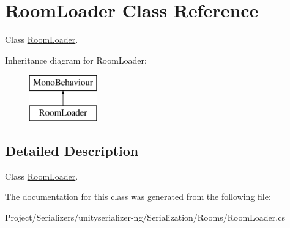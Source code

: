 \hypertarget{class_room_loader}{}\section{Room\+Loader Class Reference}
\label{class_room_loader}


Class \hyperlink{class_room_loader}{Room\+Loader}.  


Inheritance diagram for Room\+Loader\+:\begin{figure}[H]
\begin{center}
\leavevmode
\includegraphics[height=2.000000cm]{class_room_loader}
\end{center}
\end{figure}


\subsection{Detailed Description}
Class \hyperlink{class_room_loader}{Room\+Loader}. 



The documentation for this class was generated from the following file\+:\begin{DoxyCompactItemize}
\item 
Project/\+Serializers/unityserializer-\/ng/\+Serialization/\+Rooms/Room\+Loader.\+cs\end{DoxyCompactItemize}
